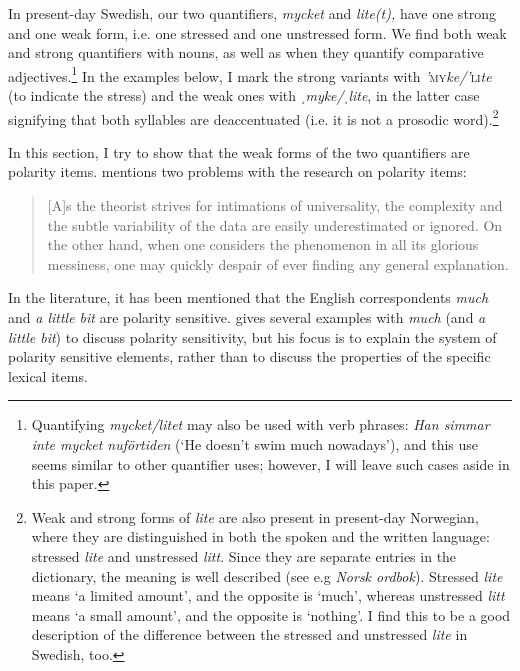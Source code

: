 \documentclass[output=paper]{langscibook}
\begin{document}
In present-day Swedish, our two quantifiers, \textit{mycket} and \textit{lite(t),} have one strong and one weak form, i.e. one stressed and one unstressed form. We find both weak and strong quantifiers with nouns, as well as when they quantify comparative adjectives.\footnote{Quantifying \textit{mycket/litet} may also be used with verb phrases: \textit{Han simmar inte mycket nuförtiden} (‘He doesn’t swim much nowadays’), and this use seems similar to other quantifier uses; however, I will leave such cases aside in this paper.} In the examples below, I mark the strong variants with \textit{’}\textsc{my}\textit{ke/’}\textsc{li}\textit{te} (to indicate the stress) and the weak ones with \textit{ˌmyke/ˌlite}, in the latter case signifying that both syllables are deaccentuated (i.e. it is not a prosodic word).\footnote{Weak and strong forms of \textit{lite} are also present in present-day Norwegian, where they are distinguished in both the spoken and the written language: stressed \textit{lite} and unstressed \textit{litt}. Since they are separate entries in the dictionary, the meaning is well described (see e.g \textit{Norsk ordbok}). Stressed \textit{lite} means ‘a limited amount’, and the opposite is ‘much’, whereas unstressed \textit{litt} means ‘a small amount’, and the opposite is ‘nothing’. I find this to be a good description of the difference between the stressed and unstressed \textit{lite} in Swedish, too.} 



In this section, I try to show that the weak forms of the two quantifiers are polarity items. \citet{Israel1996} mentions two problems with the research on polarity items:

\begin{quote}
[A]s the theorist strives for intimations of universality, the complexity and the subtle variability of the data are easily underestimated or ignored. On the other hand, when one considers the phenomenon in all its glorious messiness, one may quickly despair of ever finding any general explanation. \citep[619]{Israel1996}
\end{quote}

In the literature, it has been mentioned that the English correspondents \textit{much} and \textit{a little bit} are polarity sensitive. \citet{Israel1996} gives several examples with \textit{much} (and \textit{a little bit}) to discuss polarity sensitivity, but his focus is to explain the system of polarity sensitive elements, rather than to discuss the properties of the specific lexical items.
\end{document}
